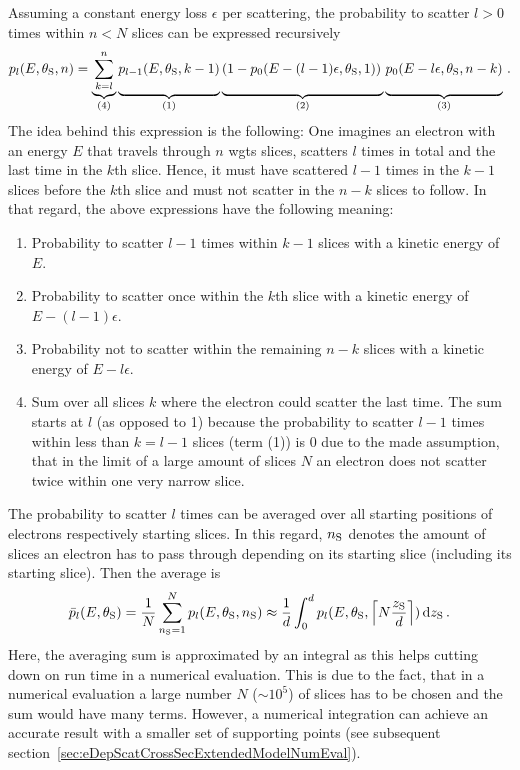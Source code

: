 Assuming a constant energy loss $\epsilon$ per scattering, the probability to scatter $l>0$ times within $n<N$ slices can be expressed recursively
\begin{equation}
\label{eq:eDepScatCrossSecExtendedModelFormalismCore}
p_l(E,\thetaSource,n) =
\underbrace{
	\sum_{k=l}^{n}
}_{(4)}
\underbrace{
	p_{l-1}(E,\thetaSource,k-1)
	\vphantom{\sum_{k=l}^{n}}
}_{(1)}
\underbrace{
	\left(
	1-p_0(E-(l-1)\epsilon,\thetaSource,1)
	\right)
	\vphantom{\sum_{k=l}^{n}}
}_{(2)}
\underbrace{
	p_0(E-l\epsilon,\thetaSource,n-k)
	\vphantom{\sum_{k=l}^{n}}
}_{(3)}
\fullstop
\end{equation}
The idea behind this expression is the following: One imagines an electron with an energy $E$ that travels through $n$ \gls{wgts} slices, scatters $l$ times in total and the last time in the $k$th slice. Hence, it must have scattered $l-1$ times in the $k-1$ slices before the $k$th slice and must not scatter in the $n-k$ slices to follow. In that regard, the above expressions have the following meaning:
\begin{enumerate}[(1)]
	\item Probability to scatter $l-1$ times within $k-1$ slices with a kinetic energy of $E$.
	\item Probability to scatter once within the $k$th slice with a kinetic energy of $E-(l-1)\epsilon$.
	\item Probability not to scatter within the remaining $n-k$ slices with a kinetic energy of $E-l\epsilon$.
	\item Sum over all slices $k$ where the electron could scatter the last time. The sum starts at $l$ (as opposed to 1) because the probability to scatter $l-1$ times within less than $k=l-1$ slices (term (1)) is 0 due to the made assumption, that in the limit of a large amount of slices $N$ an electron does not scatter twice within one very narrow slice.
\end{enumerate}
The probability to scatter $l$ times can be averaged over all starting positions of electrons respectively starting slices. In this regard, $n_\mathrm{S}$ denotes the amount of slices an electron has to pass through depending on its starting slice (including its starting slice). Then the average is
\begin{equation}
\label{eq:eDepScatCrossSecExtendedModelFormalismZAverage}
\bar{p}_l(E,\theta_\mathrm{S}) = 
\frac{1}{N}
\sum_{n_\mathrm{S}=1}^{N} p_l(E,\theta_\mathrm{S},n_\mathrm{S}) \approx
\frac{1}{d}
\int_{0}^{d}
p_l(E,\theta_\mathrm{S},
\left\lceil N \frac{z_\mathrm{S}}{d}\right\rceil
)
\mathop{}\!\mathrm{d} z_\mathrm{S}
\text{\,.}
\end{equation}
Here, the averaging sum is approximated by an integral as this helps cutting down on run time in a numerical evaluation. This is due to the fact, that in a numerical evaluation a large number $N$ ($\sim10^5$) of slices has to be chosen and the sum would have many terms. However, a numerical integration can achieve an accurate result with a smaller set of supporting points (see subsequent section~\ref{sec:eDepScatCrossSecExtendedModelNumEval}). 

